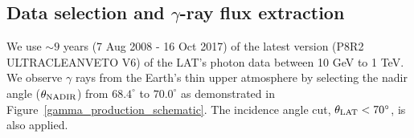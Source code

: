 \subsection{Data selection and $\gamma$-ray flux extraction}

We use $\sim9$ years (7 Aug 2008 - 16 Oct 2017) of the latest version
(P8R2 ULTRACLEANVETO V6) of the LAT's photon data between 10 GeV to 1 TeV.
We observe $\gamma$ rays from the Earth's thin upper atmosphere by selecting the
nadir angle ($\theta_{\rm NADIR}$) from $68.4^\circ$ to $70.0^\circ$ \cite{previouswork} as
demonstrated in Figure~\ref{gamma_production_schematic}. The incidence angle cut,
$\theta_{\rm LAT}<70^\circ$, is also applied.




